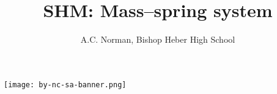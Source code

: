 \documentclass[nofonts,a4paper]{tufte-handout}
\title{SHM: Mass--spring system}
\author{A.C. Norman, Bishop Heber High School}
\date{}
\begin{document}
\maketitle%

\thispagestyle{empty}

%
%
%
%

\vfill

\noindent\texttt{[image: by-nc-sa-banner.png]}
\end{document}
